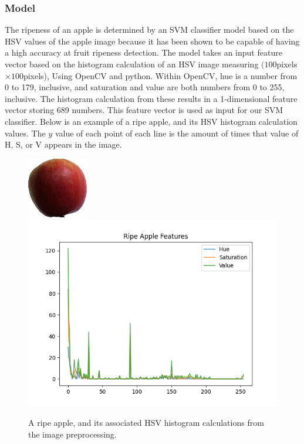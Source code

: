 \subsubsection{Model}
The ripeness of an apple is determined by an SVM classifier model based on the HSV values of the apple image because it has been shown to be capable of having a high accuracy at fruit ripeness detection\cite{HSVRipeness}.
The model takes an input feature vector based on the histogram calculation of an HSV image measuring $(100$pixels$\times100$pixels), Using OpenCV and python.
Within OpenCV, hue is a number from 0 to 179, inclusive, and saturation and value are both numbers from 0 to 255, inclusive.
The histogram calculation from these results in a 1-dimensional feature vector storing 689 numbers. 
This feature vector is used as input for our SVM classifier. Below is an example of a ripe apple, and its HSV histogram calculation values. The $y$ value of each point of each line is the amount of times that value of H, S, or V appears in the image.\\
\begin{figure}[!htb]
    \fontsize{7}{5}\selectfont
    \centering
    \includegraphics[scale=0.7]
    {figures/Ripe Apple Example.jpg}
    \includegraphics[scale=.5]
    {figures/ripeness_features.png}
    \label{Ripe Apple Example}
    \caption{
        A ripe apple, and its associated HSV histogram calculations from the image preprocessing.
    }
\end{figure}

